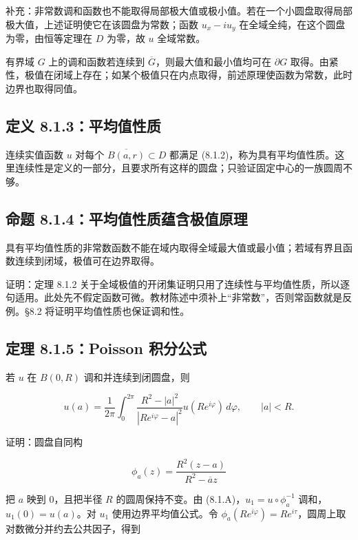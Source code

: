 \documentclass[11pt,a4paper]{article}
\begin{document}
补充：非常数调和函数也不能取得局部极大值或极小值。若在一个小圆盘取得局部极大值，上述证明使它在该圆盘为常数；函数
\(u_x-iu_y\) 在全域全纯，在这个圆盘为零，由恒等定理在 \(D\) 为零，故
\(u\) 全域常数。

有界域 \(G\) 上的调和函数若连续到
\(\overline G\)，则最大值和最小值均可在 \(\partial G\)
取得。由紧性，极值在闭域上存在；如某个极值只在内点取得，前述原理使函数为常数，此时边界也取得同值。

\subsection{定义 8.1.3：平均值性质}\label{ch08-s1-heading-5}

连续实值函数 \(u\) 对每个 \(\overline{B(a,r)}\subset D\) 都满足
(8.1.2)，称为具有平均值性质。这里连续性是定义的一部分，且要求所有这样的圆盘；只验证固定中心的一族圆周不够。

\subsection{命题 8.1.4：平均值性质蕴含极值原理}\label{ch08-s1-heading-6}

具有平均值性质的非常数函数不能在域内取得全域最大值或最小值；若域有界且函数连续到闭域，极值可在边界取得。

证明：定理 8.1.2
关于全域极值的开闭集证明只用了连续性与平均值性质，所以逐句适用。此处先不假定函数可微。教材陈述中须补上``非常数''，否则常函数就是反例。§8.2
将证明平均值性质也保证调和性。

\subsection{定理 8.1.5：Poisson 积分公式}\label{ch08-s1-heading-7}

若 \(u\) 在 \(B(0,R)\) 调和并连续到闭圆盘，则

\[
u(a)=\frac1{2\pi}\int_0^{2\pi}\frac{R^2-|a|^2}{|Re^{i\varphi}-a|^2}u(Re^{i\varphi})\,d\varphi,
\qquad |a|<R.\tag{8.1.9}
\]

证明：圆盘自同构

\[
\phi_a(z)=\frac{R^2(z-a)}{R^2-\overline a z}\tag{8.1.4}
\]

把 \(a\) 映到 \(0\)，且把半径 \(R\) 的圆周保持不变。由
(8.1.A)，\(u_1=u\circ\phi_a^{-1}\) 调和，\(u_1(0)=u(a)\)。对 \(u_1\)
使用边界平均值公式。令
\(\phi_a(Re^{i\varphi})=Re^{i\tau}\)，圆周上取对数微分并约去公共因子，得到
\end{document}
